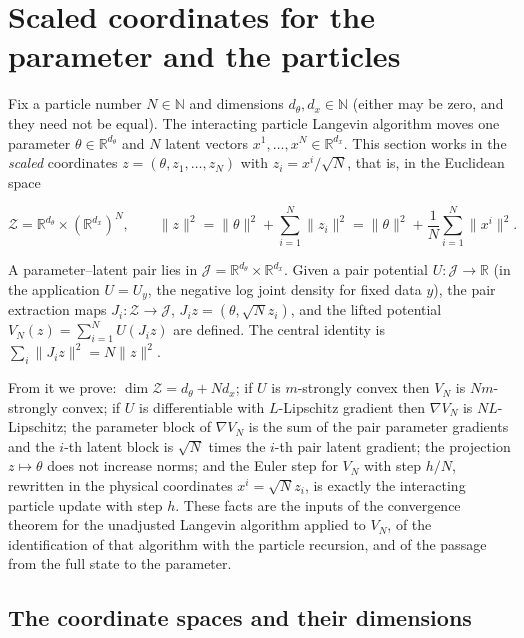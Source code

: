\documentclass[11pt,a4paper]{report}
\begin{document}
\section{\texorpdfstring{Scaled coordinates for the parameter and the particles}{Scaled coordinates for the parameter and the particles}}
\label{proof-module-IPLA-Geometry-lean}


Fix a particle number \(N\in\mathbb N\) and dimensions \(d_\theta,d_x\in\mathbb N\) (either may be zero, and they need not be equal). The interacting particle Langevin algorithm moves one parameter \(\theta\in\mathbb R^{d_\theta}\) and \(N\) latent vectors \(x^1,\dots,x^N\in\mathbb R^{d_x}\). This section works in the \emph{scaled} coordinates \(z=(\theta,z_1,\dots,z_N)\) with \(z_i=x^i/\sqrt N\), that is, in the Euclidean space


\[\mathcal Z=\mathbb R^{d_\theta}\times(\mathbb R^{d_x})^N,\qquad \|z\|^2=\|\theta\|^2+\sum_{i=1}^N\|z_i\|^2=\|\theta\|^2+\frac1N\sum_{i=1}^N\|x^i\|^2 .\]


A parameter–latent pair lies in \(\mathcal J=\mathbb R^{d_\theta}\times\mathbb R^{d_x}\). Given a pair potential \(U:\mathcal J\to\mathbb R\) (in the application \(U=U_y\), the negative log joint density for fixed data \(y\)), the pair extraction maps \(J_i:\mathcal Z\to\mathcal J\), \(J_iz=(\theta,\sqrt N z_i)\), and the lifted potential \(V_N(z)=\sum_{i=1}^NU(J_iz)\) are defined. The central identity is \(\sum_i\|J_iz\|^2=N\|z\|^2\).




From it we prove: \(\dim\mathcal Z=d_\theta+Nd_x\); if \(U\) is \(m\)-strongly convex then \(V_N\) is \(Nm\)-strongly convex; if \(U\) is differentiable with \(L\)-Lipschitz gradient then \(\nabla V_N\) is \(NL\)-Lipschitz; the parameter block of \(\nabla V_N\) is the sum of the pair parameter gradients and the \(i\)-th latent block is \(\sqrt N\) times the \(i\)-th pair latent gradient; the projection \(z\mapsto\theta\) does not increase norms; and the Euler step for \(V_N\) with step \(h/N\), rewritten in the physical coordinates \(x^i=\sqrt Nz_i\), is exactly the interacting particle update with step \(h\). These facts are the inputs of the convergence theorem for the unadjusted Langevin algorithm applied to \(V_N\), of the identification of that algorithm with the particle recursion, and of the passage from the full state to the parameter.

\subsection{\texorpdfstring{The coordinate spaces and their dimensions}{The coordinate spaces and their dimensions}}
\label{report-step-IPLA-Geometry-lean-1}
\end{document}
